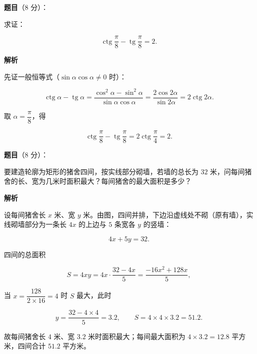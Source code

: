 \begin{answer}

\textbf{题目}（8 分）：

求证：

\nopagebreak[4]
\[
\operatorname{ctg}\frac{\pi}{8}-\operatorname{tg}\frac{\pi}{8}=2.
\]

\textbf{解析}

先证一般恒等式（$\sin\alpha\cos\alpha\ne0$ 时）：

\nopagebreak[4]
\[
\operatorname{ctg}\alpha-\operatorname{tg}\alpha
=\frac{\cos^2\alpha-\sin^2\alpha}{\sin\alpha\cos\alpha}
=\frac{2\cos2\alpha}{\sin2\alpha}
=2\operatorname{ctg}2\alpha.
\]

取 $\alpha=\dfrac{\pi}{8}$，得

\nopagebreak[4]
\[
\operatorname{ctg}\frac{\pi}{8}-\operatorname{tg}\frac{\pi}{8}
=2\operatorname{ctg}\frac{\pi}{4}=2.
\]


\end{answer}
\begin{answer}

\textbf{题目}（8 分）：

要建造轮廓为矩形的猪舍四间，按实线部分砌墙，若墙的总长为 $32$ 米，问每间猪舍的长、宽为几米时面积最大？每间猪舍的最大面积是多少？
\nopagebreak[4]
\begin{center}\end{center}
\nopagebreak[4]
\textbf{解析}
\nopagebreak[4]
\begin{center}\end{center}
\nopagebreak[4]
设每间猪舍长 $x$ 米、宽 $y$ 米。由图，四间并排，下边沿虚线处不砌（原有墙），实线砌墙部分为一条长 $4x$ 的上边与 $5$ 条宽各 $y$ 的竖墙：

\nopagebreak[4]
\[
4x+5y=32.
\]

四间的总面积

\nopagebreak[4]
\[
S=4xy=4x\cdot\frac{32-4x}{5}=\frac{-16x^2+128x}{5},
\]

当 $x=\dfrac{128}{2\times16}=4$ 时 $S$ 最大，此时

\nopagebreak[4]
\[
y=\frac{32-4\times4}{5}=3.2,
\qquad
S=4\times4\times3.2=51.2.
\]

故每间猪舍长 $4$ 米、宽 $3.2$ 米时面积最大；每间最大面积为 $4\times3.2=12.8$ 平方米，四间合计 $51.2$ 平方米。


\end{answer}
